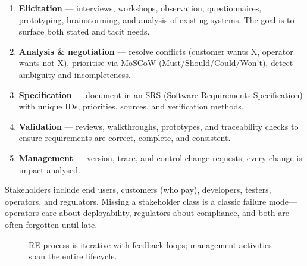 \begin{enumerate}
    \item \textbf{Elicitation} --- interviews, workshops, observation, questionnaires, prototyping, brainstorming, and analysis of existing systems. The goal is to surface both stated and tacit needs.
    \item \textbf{Analysis \& negotiation} --- resolve conflicts (customer wants X, operator wants not-X), prioritise via MoSCoW (Must/Should/Could/Won't), detect ambiguity and incompleteness.
    \item \textbf{Specification} --- document in an SRS (Software Requirements Specification) with unique IDs, priorities, sources, and verification methods.
    \item \textbf{Validation} --- reviews, walkthroughs, prototypes, and traceability checks to ensure requirements are correct, complete, and consistent.
    \item \textbf{Management} --- version, trace, and control change requests; every change is impact-analysed.
\end{enumerate}

Stakeholders include end users, customers (who pay), developers, testers, operators, and regulators. Missing a stakeholder class is a classic failure mode---operators care about deployability, regulators about compliance, and both are often forgotten until late.

\begin{figure}[h]
\centering
{}
\caption{RE process is iterative with feedback loops; management activities span the entire lifecycle.}
\end{figure}


